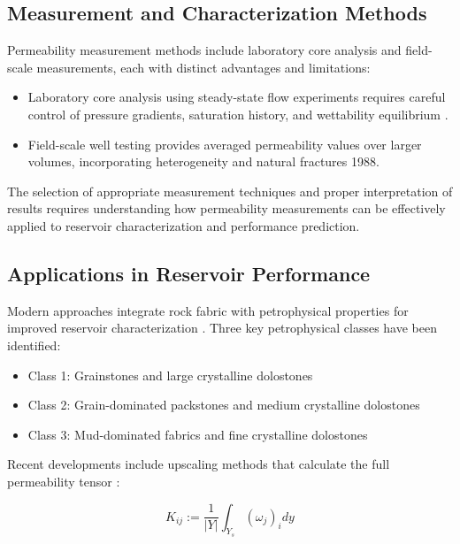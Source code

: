 \documentclass[journal]{IEEEtran}
\begin{document}
\subsection{Measurement and Characterization Methods}

Permeability measurement methods include laboratory core analysis and field-scale measurements, each with distinct advantages and limitations:

\begin{itemize}
    \item Laboratory core analysis using steady-state flow experiments requires careful control of pressure gradients, saturation history, and wettability equilibrium \parencite{chapuis_use_2003}.
    \item Field-scale well testing provides averaged permeability values over larger volumes, incorporating heterogeneity and natural fractures 1988\parencite{honarpour_relative-permeability_1988}.
\end{itemize}

The selection of appropriate measurement techniques and proper interpretation of results requires understanding how permeability measurements can be effectively applied to reservoir characterization and performance prediction.

\subsection{Applications in Reservoir Performance}

Modern approaches integrate rock fabric with petrophysical properties for improved reservoir characterization \parencite{f_jerry_lucia_2_rock-fabricpetrophysical_1995}. Three key petrophysical classes have been identified:

\begin{itemize}
    \item Class 1: Grainstones and large crystalline dolostones
    \item Class 2: Grain-dominated packstones and medium crystalline dolostones
    \item Class 3: Mud-dominated fabrics and fine crystalline dolostones
\end{itemize}

Recent developments include upscaling methods that calculate the full permeability tensor \parencite{schulz_beyond_2019}:

\begin{equation}
K_{ij} := \frac{1}{|Y|}\int_{Y_s}(\omega_j)_i dy
\end{equation}
\end{document}
